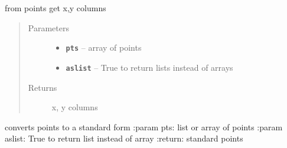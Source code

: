 \documentclass[letterpaper,10pt,english]{sphinxmanual}
\begin{document}

\begin{fulllineitems}
\label{RRtoolbox.lib.arrayops:RRtoolbox.lib.arrayops.basic.splitPoints}
from points get x,y columns
\begin{quote}\begin{description}
\item[{Parameters}] \leavevmode\begin{itemize}
\item {} 
\textbf{\texttt{pts}} -- array of points

\item {} 
\textbf{\texttt{aslist}} -- True to return lists instead of arrays

\end{itemize}

\item[{Returns}] \leavevmode
x, y columns

\end{description}\end{quote}

\end{fulllineitems}


\begin{fulllineitems}
\label{RRtoolbox.lib.arrayops:RRtoolbox.lib.arrayops.basic.standarizePoints}
converts points to a standard form
:param pts: list or array of points
:param aslist: True to return list instead of array
:return: standard points

\end{fulllineitems}

\end{document}
